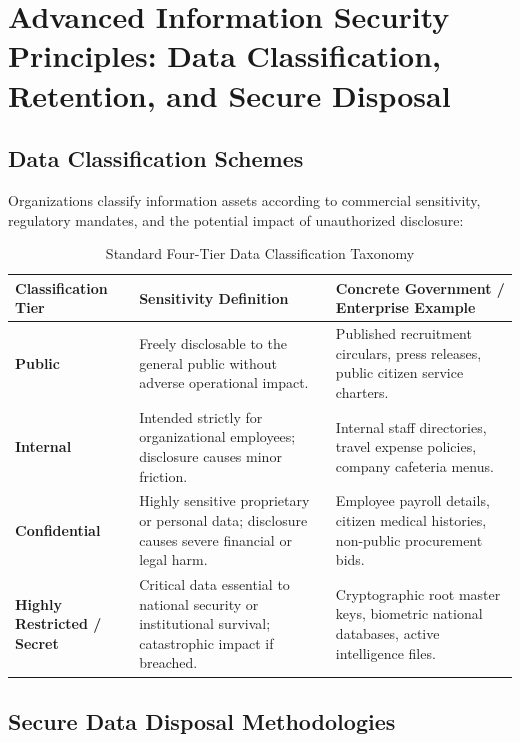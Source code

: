 \newpage
\section{Advanced Information Security Principles: Data Classification, Retention, and Secure Disposal}

\subsection{Data Classification Schemes}

Organizations classify information assets according to commercial sensitivity, regulatory mandates, and the potential impact of unauthorized disclosure:

\begin{table}[htbp]
\centering
\caption{Standard Four-Tier Data Classification Taxonomy}
\label{tab:data_classification}
\begin{tabularx}{\textwidth}{p{3.2cm} X X}
\toprule
\textbf{Classification Tier} & \textbf{Sensitivity Definition} & \textbf{Concrete Government / Enterprise Example} \\
\midrule
\textbf{Public} & Freely disclosable to the general public without adverse operational impact. & Published recruitment circulars, press releases, public citizen service charters. \\
\textbf{Internal} & Intended strictly for organizational employees; disclosure causes minor friction. & Internal staff directories, travel expense policies, company cafeteria menus. \\
\textbf{Confidential} & Highly sensitive proprietary or personal data; disclosure causes severe financial or legal harm. & Employee payroll details, citizen medical histories, non-public procurement bids. \\
\textbf{Highly Restricted / Secret} & Critical data essential to national security or institutional survival; catastrophic impact if breached. & Cryptographic root master keys, biometric national databases, active intelligence files. \\
\bottomrule
\end{tabularx}
\end{table}

\subsection{Secure Data Disposal Methodologies}

